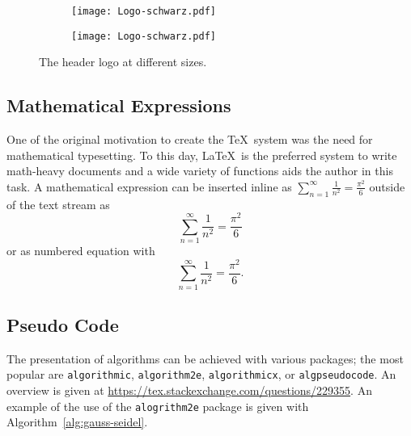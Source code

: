 \begin{figure}[h]
  \centering
  \begin{subfigure}[b]{0.45\columnwidth}
    \centering
    \texttt{[image: Logo-schwarz.pdf]}
    \label{fig:intro:full width}
  \end{subfigure}
  \begin{subfigure}[b]{0.45\columnwidth}
    \centering
    \texttt{[image: Logo-schwarz.pdf]}
    \label{fig:intro:half width}
  \end{subfigure}
  \caption[Optional caption for the figure list (often used to abbreviate long captions)]{The header logo at different sizes.} %
  \label{fig:intro} %
\end{figure}

\subsection{Mathematical Expressions}

One of the original motivation to create the \TeX\ system was the need for mathematical typesetting.
To this day, \LaTeX\ is the preferred system to write math-heavy documents and a wide variety of functions aids the author in this task.
A mathematical expression can be inserted inline as $\sum_{n=1}^{\infty} \frac{1}{n^2} = \frac{\pi^2}{6}$ outside of the text stream as \[ \sum_{n=1}^{\infty} \frac{1}{n^2} = \frac{\pi^2}{6} \] or as numbered equation with
\begin{equation}
\sum_{n=1}^{\infty} \frac{1}{n^2} = \frac{\pi^2}{6}.
\end{equation}

\subsection{Pseudo Code}

The presentation of algorithms can be achieved with various packages; the most popular are \verb|algorithmic|, \verb|algorithm2e|, \verb|algorithmicx|, or \verb|algpseudocode|.
An overview is given at \url{https://tex.stackexchange.com/questions/229355}.
An example of the use of the \verb|alogrithm2e| package is given with Algorithm~\ref{alg:gauss-seidel}.

